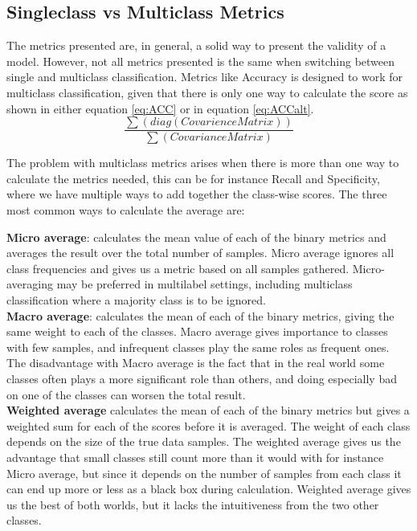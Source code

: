 \subsection{Singleclass vs Multiclass Metrics}

The metrics presented are, in general, a solid way to present the validity of a model. However, not all metrics presented is the same when switching between single and multiclass classification.  Metrics like Accuracy is designed to work for multiclass classification, given that there is only one way to calculate the score as shown in either equation \ref{eq:ACC} or in equation \ref{eq:ACCalt}.
\begin{equation}
\frac{\sum (diag(Covarience Matrix))}{\sum(Covariance Matrix)}
\label{eq:ACCalt}
\end{equation}

The problem with multiclass metrics arises when there is more than one way to calculate the metrics needed, this can be for instance Recall and Specificity, where we have multiple ways to add together the class-wise scores. The three most common ways to calculate the average are:

\textbf{Micro average}: calculates the mean value of each of the binary metrics and averages the result over the total number of samples. 
Micro average ignores all class frequencies and gives us a metric based on all samples gathered. Micro-averaging may be preferred in multilabel settings, including multiclass classification where a majority class is to be ignored.\\

\textbf{Macro average}: calculates the mean of each of the binary metrics, giving the same weight to each of the classes. Macro average gives importance to classes with few samples, and infrequent classes play the same roles as frequent ones. The disadvantage with Macro average is the fact that in the real world some classes often plays a more significant role than others, and doing especially bad on one of the classes can worsen the total result. \\

\textbf{Weighted average} calculates the mean of each of the binary metrics but gives a weighted sum for each of the scores before it is averaged. 
The weight of each class depends on the size of the true data samples.
The weighted average gives us the advantage that small classes still count more than it would with for instance Micro average, but since it depends on the number of samples from each class it can end up more or less as a black box during calculation.
Weighted average gives us the best of both worlds, but it lacks the intuitiveness from the two other classes. \\


